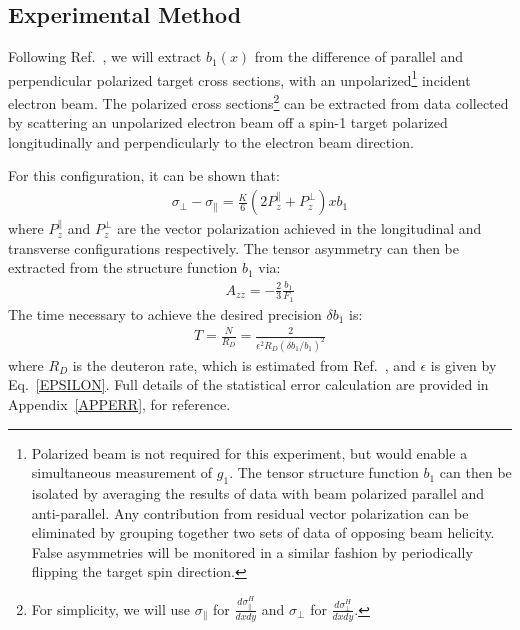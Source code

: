 \subsection{Experimental Method}
\setcounter{footnote}{2}
Following Ref.~\cite{Hoodbhoy:1988am},  we will extract $b_1(x)$ from
the difference of parallel and perpendicular polarized target cross sections, 
with an unpolarized\footnote{Polarized beam is not required for this experiment, but would enable a simultaneous measurement of $g_1$.  The
tensor structure function $b_1$ can then be isolated by averaging the results of data with beam polarized parallel and anti-parallel.  Any contribution from residual vector polarization can be eliminated by grouping together two sets of data of opposing beam helicity.  False asymmetries will be monitored in a similar fashion by periodically flipping the target spin direction.} incident electron beam.  
The polarized cross sections\footnote{For simplicity, we will use $\sigma_{\parallel}$ for $\frac{d\sigma_{\parallel}^H}{dxdy}$ and $\sigma_{\perp}$ for $\frac{d\sigma_{\perp}^H}{dxdy}$.} 
can be extracted from data collected by scattering an unpolarized electron beam off a spin-1 target
polarized longitudinally and perpendicularly to the electron beam direction.
%

For this configuration, it can be shown that:
%
\begin{eqnarray}
 \sigma_{\perp} - \sigma_{\parallel} = \frac{K}{6} (2 P_z^{\parallel} + P_z^{\perp}) x b_1
\label{MAIN}
\end{eqnarray}
where $P_z^{\parallel}$ and $P_z^{\perp}$ are the vector polarization achieved in the longitudinal and transverse configurations respectively. 
%
The tensor asymmetry can then be extracted from the structure function $b_1$ via:
\begin{eqnarray}
\label{STUFF}
A_{zz} = -\frac{2}{3} \frac{b_1}{F_1} 
\label{Azz}
\end{eqnarray}
The time necessary to achieve the desired precision $\delta b_1$ is:
\begin{eqnarray}
T = \frac{N}{R_D} = \frac{2}{\epsilon^2 R_D (\delta b_1 / b_1)^2}
\label{none}
\end{eqnarray}
%
where $R_D$ is the deuteron rate, which is estimated from Ref.~\cite{Martin:2009iq}, and $\epsilon$ is given  by Eq.~\ref{EPSILON}. 
Full details of the statistical error calculation are provided in Appendix~\ref{APPERR}, for reference.


